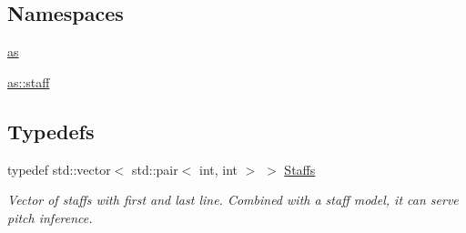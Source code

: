 \subsection*{Namespaces}
\begin{DoxyCompactItemize}
\item 
 \hyperlink{namespaceas}{as}
\item 
 \hyperlink{namespaceas_1_1staff}{as\+::staff}
\end{DoxyCompactItemize}
\subsection*{Typedefs}
\begin{DoxyCompactItemize}
\item 
typedef std\+::vector$<$ std\+::pair$<$ int, int $>$ $>$ \hyperlink{staff_8hh_acfffa1dd2bf9ce5820435e63446a7c90}{Staffs}
\begin{DoxyCompactList}\small\item\em Vector of staffs with first and last line. Combined with a staff model, it can serve pitch inference. \end{DoxyCompactList}\end{DoxyCompactItemize}
